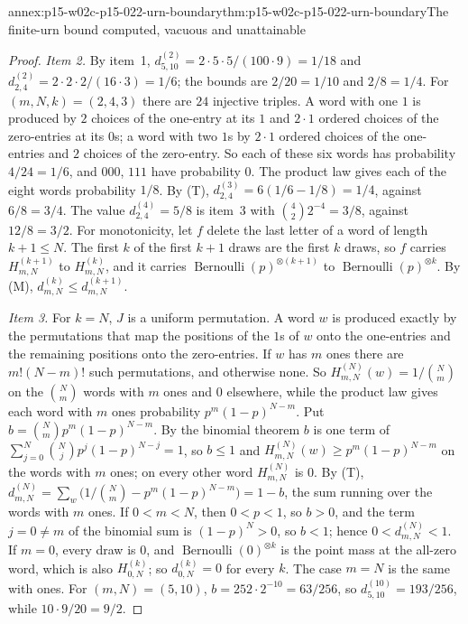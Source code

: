 \begin{annexitem}{annex:p15-w02c-p15-022-urn-boundary}{thm:p15-w02c-p15-022-urn-boundary}{The finite-urn bound computed, vacuous and unattainable}
\begin{proof}
\emph{Item 2.} By item~1, \(d_{5,10}^{(2)}=2\cdot5\cdot5/(100\cdot9)=1/18\)
and \(d_{2,4}^{(2)}=2\cdot2\cdot2/(16\cdot3)=1/6\); the bounds are
\(2/20=1/10\) and \(2/8=1/4\). For \((m,N,k)=(2,4,3)\) there are \(24\)
injective triples. A word with one \(1\) is produced by \(2\) choices of
the one-entry at its \(1\) and \(2\cdot1\) ordered choices of the
zero-entries at its \(0\)s; a word with two \(1\)s by \(2\cdot1\) ordered
choices of the one-entries and \(2\) choices of the zero-entry. So each
of these six words has probability \(4/24=1/6\), and \(000\), \(111\)
have probability \(0\). The product law gives each of the eight words
probability \(1/8\). By (T),
\(d_{2,4}^{(3)}=6(1/6-1/8)=1/4\), against \(6/8=3/4\). The value
\(d_{2,4}^{(4)}=5/8\) is item~3 with \(\binom42 2^{-4}=3/8\), against
\(12/8=3/2\). For monotonicity, let \(f\) delete the last letter of a
word of length \(k+1\leq N\). The first \(k\) of the first \(k+1\) draws
are the first \(k\) draws, so \(f\) carries \(H_{m,N}^{(k+1)}\) to
\(H_{m,N}^{(k)}\), and it carries
\(\operatorname{Bernoulli}(p)^{\otimes(k+1)}\) to
\(\operatorname{Bernoulli}(p)^{\otimes k}\). By (M),
\(d_{m,N}^{(k)}\leq d_{m,N}^{(k+1)}\).

\emph{Item 3.} For \(k=N\), \(J\) is a uniform permutation. A word
\(w\) is produced exactly by the permutations that map the positions of
the \(1\)s of \(w\) onto the one-entries and the remaining positions
onto the zero-entries. If \(w\) has \(m\) ones there are \(m!(N-m)!\)
such permutations, and otherwise none. So
\(H_{m,N}^{(N)}(w)=1/\binom Nm\) on the \(\binom Nm\) words with \(m\)
ones and \(0\) elsewhere, while the product law gives each word with
\(m\) ones probability \(p^m(1-p)^{N-m}\). Put
\(b=\binom Nm p^m(1-p)^{N-m}\). By the binomial theorem \(b\) is one term
of \(\sum_{j=0}^N\binom Nj p^j(1-p)^{N-j}=1\), so \(b\leq1\) and
\(H_{m,N}^{(N)}(w)\geq p^m(1-p)^{N-m}\) on the words with \(m\) ones;
on every other word \(H_{m,N}^{(N)}\) is \(0\). By (T),
\(d_{m,N}^{(N)}=\sum_{w}\bigl(1/\binom Nm-p^m(1-p)^{N-m}\bigr)=1-b\), the
sum running over the words with \(m\) ones. If \(0<m<N\), then
\(0<p<1\), so \(b>0\), and the term \(j=0\neq m\) of the binomial sum
is \((1-p)^N>0\), so \(b<1\); hence \(0<d_{m,N}^{(N)}<1\). If \(m=0\),
every draw is \(0\), and \(\operatorname{Bernoulli}(0)^{\otimes k}\) is
the point mass at the all-zero word, which is also
\(H_{0,N}^{(k)}\); so \(d_{0,N}^{(k)}=0\) for every \(k\). The case
\(m=N\) is the same with ones. For \((m,N)=(5,10)\),
\(b=252\cdot2^{-10}=63/256\), so \(d_{5,10}^{(10)}=193/256\), while
\(10\cdot9/20=9/2\).


\end{proof}
\end{annexitem}
